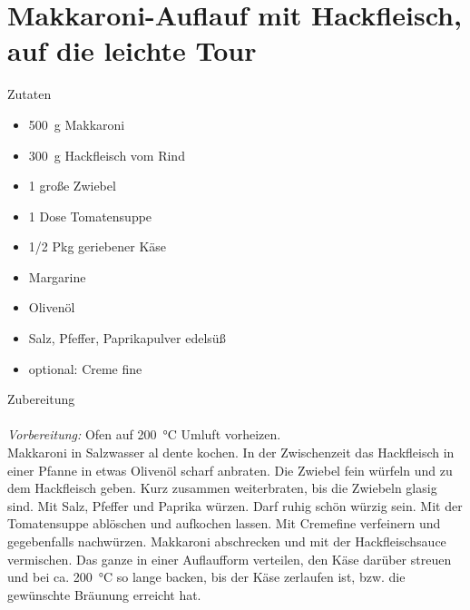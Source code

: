 \section*{Makkaroni-Auflauf mit Hackfleisch, auf die leichte Tour}
\ihead{}\ohead{}
\cfoot{}
{\Large Zutaten}
\begin{multicols}{2}
\begin{itemize}
    \item \SI{500}{g} Makkaroni
    \item \SI{300}{g} Hackfleisch vom Rind
    \item \num{1} große Zwiebel
    \item \num{1} Dose Tomatensuppe
    \item \num{1/2} Pkg geriebener Käse
    \item Margarine
    \item Olivenöl
    \item Salz, Pfeffer, Paprikapulver edelsüß
    \item optional: Creme fine
\end{itemize}
\end{multicols}
\noindent
{\Large Zubereitung}\\
\\
\textit{Vorbereitung:} Ofen auf \SI{200}{\celsius} Umluft vorheizen.\\
Makkaroni in Salzwasser al dente kochen.
In der Zwischenzeit das Hackfleisch in einer Pfanne in etwas Olivenöl scharf anbraten.
Die Zwiebel fein würfeln und zu dem Hackfleisch geben.
Kurz zusammen weiterbraten, bis die Zwiebeln glasig sind.
Mit Salz, Pfeffer und Paprika würzen.
Darf ruhig schön würzig sein.
Mit der Tomatensuppe ablöschen und aufkochen lassen.
Mit Cremefine verfeinern und gegebenfalls nachwürzen.
Makkaroni abschrecken und mit der Hackfleischsauce vermischen.
Das ganze in einer Auflaufform verteilen, den Käse darüber streuen und bei ca. \SI{200}{\celsius} so lange backen, bis der Käse zerlaufen ist, bzw. die gewünschte Bräunung erreicht hat.